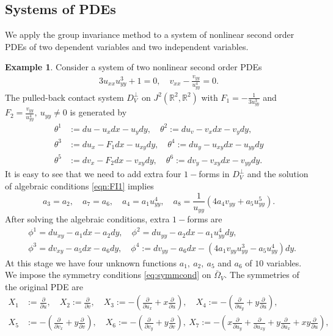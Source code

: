 \documentclass[a4paper, 11pt]{amsart}
\theoremstyle{definition}
\newtheorem{example}[theorem]{Example}
\begin{document}
\subsection{Systems of PDEs}
We apply the group invariance method to a system of nonlinear second order PDEs of two dependent variables and two independent variables.
\begin{example}
Consider a system of two nonlinear second order PDEs \cite{VAM2009}
\begin{align}
 3u_{xx}u_{yy}^3+1=0,\quad  v_{xx}-\frac{v_{yy}}{u_{yy}^4}=0.
 \end{align}
 The pulled-back  contact system $D^{\perp}_V$ on $J^2({\mathbb{R}}^2,{\mathbb{R}}^2)$ with $F_1=-\frac{1}{3u_{yy}^3}$ and $F_2=\frac{v_{yy}}{u_{yy}^4}, ~u_{yy}\neq 0$ is generated by
\begin{align}
\theta^1&:=du-u_xdx-u_ydy,\quad\theta^2:=du_v-v_{x}dx-v_{y}dy,\nonumber\\
 \theta^3&:=du_x-F_1dx-u_{xy}dy,\quad \theta^4:=du_y-u_{xy}d x-u_{yy}dy\label{syscontact dist} \\
 \theta^5&:=dv_x-F_2dx-v_{xy}dy,\quad\theta^6:=dv_y-v_{xy}d x-v_{yy}dy.\nonumber
 \end{align}
It is easy to see that we need to add extra four $1-$forms in $D^{\perp}_V$ and the solution of algebraic conditions \eqref{eqn:FI1} implies
\[a_{3}  =a_{2},\quad a_7=a_6,\quad a_4=a_1u_{yy}^4,\quad a_8= \frac{1}{u_{yy}}(4a_4v_{yy}+a_5u_{yy}^5).\]
After solving the algebraic conditions, extra $1-$forms are
\begin{align*}
  &\phi^1=du_{xy}-a_1dx-a_2dy,\quad \phi^2=du_{yy}-a_2dx-a_1u_{yy}^4dy,\\
  &\phi^3=dv_{xy}-a_5dx-a_6dy, \quad \phi^4:=dv_{yy}-a_6dx-(4a_1v_{yy}u_{yy}^3-a_5u_{yy}^4)dy.
\end{align*}
At this stage we have four unknown functions $a_1,~a_2,~a_5$ and $a_6$ of $10$ variables. We impose the symmetry conditions \eqref{eq:symmcond} on $\bar{\Omega}_V.$ The symmetries of the original PDE are
\begin{align*}
X_1&:={\frac{\partial}{\partial{u}}},\quad X_2:={\frac{\partial}{\partial{v}}},\quad X_3:=-({\frac{\partial}{\partial{u_x}}}+x{\frac{\partial}{\partial{u}}}),\quad X_4:=-({\frac{\partial}{\partial{u_y}}}+y{\frac{\partial}{\partial{u}}}),\\
X_5&:=-({\frac{\partial}{\partial{v_x}}}+y{\frac{\partial}{\partial{v}}}),\quad X_6:=-({\frac{\partial}{\partial{v_y}}}+y{\frac{\partial}{\partial{v}}}),~X_7:=-(x{\frac{\partial}{\partial{u_y}}}+{\frac{\partial}{\partial{u_{xy}}}}+y{\frac{\partial}{\partial{u_x}}}+xy{\frac{\partial}{\partial{u}}}),\\

\end{align*}
\end{example}
\end{document}
